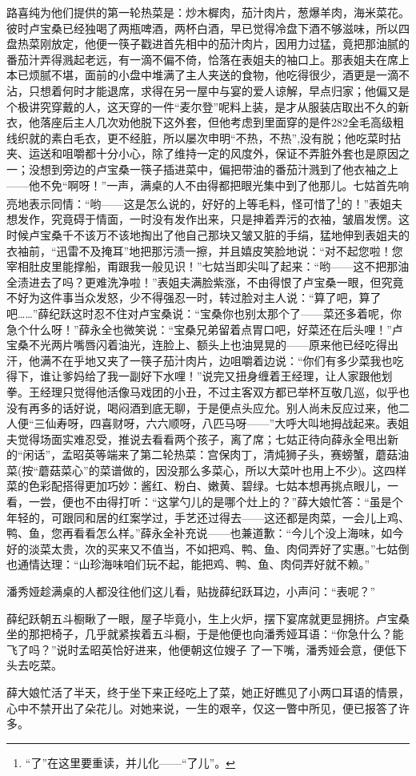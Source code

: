 \par 路喜纯为他们提供的第一轮热菜是：炒木樨肉，茄汁肉片，葱爆羊肉，海米菜花。彼时卢宝桑已经独喝了两瓶啤酒，两杯白酒，早已觉得冷盘下酒不够滋味，所以四盘热菜刚放定，他便一筷子戳进首先相中的茄汁肉片，因用力过猛，竟把那油腻的番茄汁弄得溅起老远，有一滴不偏不倚，恰落在表姐夫的袖口上。那表姐夫在席上本已烦腻不堪，面前的小盘中堆满了主人夹送的食物，他吃得很少，酒更是一滴不沾，只想着何时才能退席，求得在另一屋中与宴的爱人谅解，早点归家；他偏又是个极讲究穿戴的人，这天穿的一件“麦尔登”呢料上装，是才从服装店取出不久的新衣，他落座后主人几次劝他脱下这外套，但他考虑到里面穿的是件282全毛高级粗线织就的素白毛衣，更不经脏，所以屡次申明“不热，不热”,没有脱；他吃菜时拈夹、运送和咀嚼都十分小心，除了维持一定的风度外，保证不弄脏外套也是原因之一；没想到旁边的卢宝桑一筷子插进菜中，偏把带油的番茄汁溅到了他衣袖之上——他不免“啊呀！”一声，满桌的人不由得都把眼光集中到了他那儿。七姑首先响亮地表示同情：“哟——这是怎么说的，好好的上等毛料，怪可惜了\footnote{“了”在这里要重读，并儿化——“了儿”。}的！”表姐夫想发作，究竟碍于情面，一时没有发作出来，只是抻着弄污的衣袖，皱眉发愣。这时候卢宝桑千不该万不该地掏出了他自己那块又皱又脏的手绢，猛地伸到表姐夫的衣袖前，“迅雷不及掩耳”地把那污渍一擦，并且嬉皮笑脸地说：“对不起您啦！您宰相肚皮里能撑船，甭跟我一般见识！”七姑当即尖叫了起来：“哟——这不把那油全渍进去了吗？更难洗净啦！”表姐夫满脸紫涨，不由得恨了卢宝桑一眼，但究竟不好为这件事当众发怒，少不得强忍一时，转过脸对主人说：“算了吧，算了吧……”薛纪跃这时忍不住对卢宝桑说：“宝桑你也别太那个了——菜还多着呢，你急个什么呀！”薛永全也微笑说：“宝桑兄弟留着点胃口吧，好菜还在后头哩！”卢宝桑不光两片嘴唇闪着油光，连脸上、额头上也油晃晃的——原来他已经吃得出汗，他满不在乎地又夹了一筷子茄汁肉片，边咀嚼着边说：“你们有多少菜我也吃得下，谁让爹妈给了我一副好下水哩！”说完又扭身缠着王经理，让人家跟他划拳。王经理只觉得他活像马戏团的小丑，不过主客双方都已举杯互敬几巡，似乎也没有再多的话好说，喝闷酒到底无聊，于是便点头应允。别人尚未反应过来，他二人便“三仙寿呀，四喜财呀，六六顺呀，八匹马呀——”大呼大叫地拇战起来。表姐夫觉得场面实难忍受，推说去看看两个孩子，离了席；七姑正待向薛永全甩出新的“闲话”，孟昭英等端来了第二轮热菜：宫保肉丁，清炖狮子头，赛螃蟹，蘑菇油菜(按“蘑菇菜心”的菜谱做的，因没那么多菜心，所以大菜叶也用上不少)。这四样菜的色彩配搭得更加巧妙：酱红、粉白、嫩黄、碧绿。七姑本想再挑点眼儿，一看，一尝，便也不由得打听：“这掌勺儿的是哪个灶上的？”薛大娘忙答：“虽是个年轻的，可跟同和居的红案学过，手艺还过得去——这还都是肉菜，一会儿上鸡、鸭、鱼，您再看看怎么样。”薛永全补充说——也兼道歉：“今儿个没上海味，如今好的淡菜太贵，次的买来又不值当，不如把鸡、鸭、鱼、肉伺弄好了实惠。”七姑倒也通情达理：“山珍海味咱们玩不起，能把鸡、鸭、鱼、肉伺弄好就不赖。”
\par 潘秀娅趁满桌的人都没往他们这儿看，贴拢薛纪跃耳边，小声问：“表呢？”
\par 薛纪跃朝五斗橱瞅了一眼，屋子毕竟小，生上火炉，摆下宴席就更显拥挤。卢宝桑坐的那把椅子，几乎就紧挨着五斗橱，于是他便也向潘秀娅耳语：“你急什么？能飞了吗？”说时孟昭英恰好进来，他便朝这位嫂子𠴂了一下嘴，潘秀娅会意，便低下头去吃菜。
\par 薛大娘忙活了半天，终于坐下来正经吃上了菜，她正好瞧见了小两口耳语的情景，心中不禁开出了朵花儿。对她来说，一生的艰辛，仅这一瞥中所见，便已报答了许多。


